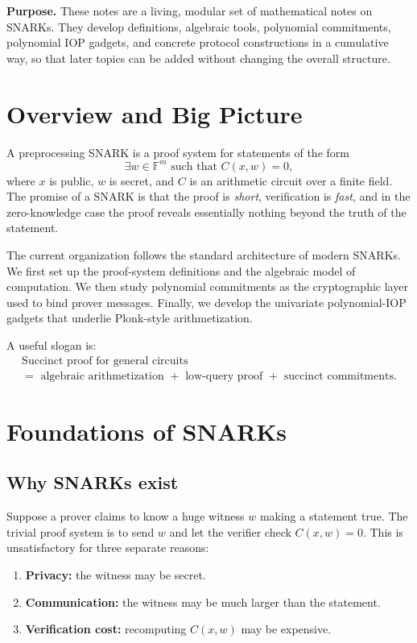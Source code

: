 \documentclass[11pt]{article}
\newcommand{\F}{\mathbb{F}}
\begin{document}
\begin{tcolorbox}
\textbf{Purpose.} These notes are a living, modular set of mathematical notes on SNARKs. They develop definitions, algebraic tools, polynomial commitments, polynomial IOP gadgets, and concrete protocol constructions in a cumulative way, so that later topics can be added without changing the overall structure.
\end{tcolorbox}

\tableofcontents
\newpage

\section{Overview and Big Picture}

A preprocessing SNARK is a proof system for statements of the form
\[
\exists w \in \F^m \text{ such that } C(x,w)=0,
\]
where $x$ is public, $w$ is secret, and $C$ is an arithmetic circuit over a finite field. The promise of a SNARK is that the proof is \emph{short}, verification is \emph{fast}, and in the zero-knowledge case the proof reveals essentially nothing beyond the truth of the statement.

The current organization follows the standard architecture of modern SNARKs. We first set up the proof-system definitions and the algebraic model of computation. We then study polynomial commitments as the cryptographic layer used to bind prover messages. Finally, we develop the univariate polynomial-IOP gadgets that underlie Plonk-style arithmetization.

A useful slogan is:
\[
\boxed{
\begin{array}{c}
\text{Succinct proof for general circuits}\\[0.2em]
=\text{ algebraic arithmetization }+\text{ low-query proof }+\text{ succinct commitments}.
\end{array}}
\]

\section{Foundations of SNARKs}

\subsection{Why SNARKs exist}

Suppose a prover claims to know a huge witness $w$ making a statement true. The trivial proof system is to send $w$ and let the verifier check $C(x,w)=0$. This is unsatisfactory for three separate reasons:
\begin{enumerate}[leftmargin=2em]
    \item \textbf{Privacy:} the witness may be secret.
    \item \textbf{Communication:} the witness may be much larger than the statement.
    \item \textbf{Verification cost:} recomputing $C(x,w)$ may be expensive.
\end{enumerate}
\end{document}
